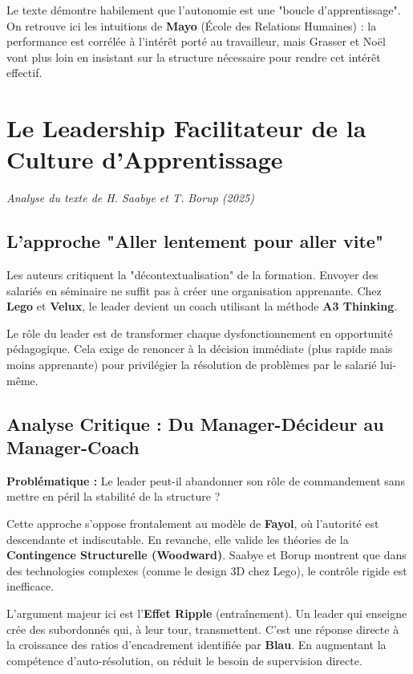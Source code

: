 \documentclass[12pt,a4paper]{report}
\begin{document}
Le texte démontre habilement que l'autonomie est une "boucle d'apprentissage". On retrouve ici les intuitions de \textbf{Mayo} (École des Relations Humaines) : la performance est corrélée à l'intérêt porté au travailleur, mais Grasser et Noël vont plus loin en insistant sur la structure nécessaire pour rendre cet intérêt effectif.

\newpage

\section{Le Leadership Facilitateur de la Culture d'Apprentissage}
\textit{Analyse du texte de H. Saabye et T. Borup (2025)}

\subsection{L'approche "Aller lentement pour aller vite"}
Les auteurs critiquent la "décontextualisation" de la formation. Envoyer des salariés en séminaire ne suffit pas à créer une organisation apprenante. Chez \textbf{Lego} et \textbf{Velux}, le leader devient un coach utilisant la méthode \textbf{A3 Thinking}. 



Le rôle du leader est de transformer chaque dysfonctionnement en opportunité pédagogique. Cela exige de renoncer à la décision immédiate (plus rapide mais moins apprenante) pour privilégier la résolution de problèmes par le salarié lui-même.

\subsection{Analyse Critique : Du Manager-Décideur au Manager-Coach}
\textbf{Problématique :} Le leader peut-il abandonner son rôle de commandement sans mettre en péril la stabilité de la structure ?

Cette approche s'oppose frontalement au modèle de \textbf{Fayol}, où l'autorité est descendante et indiscutable. En revanche, elle valide les théories de la \textbf{Contingence Structurelle (Woodward)}. Saabye et Borup montrent que dans des technologies complexes (comme le design 3D chez Lego), le contrôle rigide est inefficace. 

L'argument majeur ici est l'\textbf{Effet Ripple} (entraînement). Un leader qui enseigne crée des subordonnés qui, à leur tour, transmettent. C'est une réponse directe à la croissance des ratios d'encadrement identifiée par \textbf{Blau}. En augmentant la compétence d'auto-résolution, on réduit le besoin de supervision directe.
\end{document}

